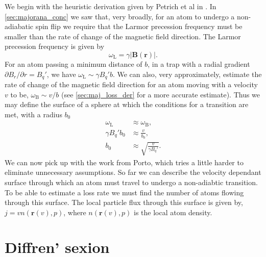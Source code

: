 We begin with the heuristic derivation given by Petrich et al in \cite{Petrich1995}.
In \autoref{sec:majorana_conc} we saw that, very broadly, for an atom to undergo a non-adiabatic spin flip we require that the Larmor precession frequency must be smaller than the rate of change of the magnetic field direction.
The Larmor precession frequency is given by
\begin{equation}
    \omega_{\textrm{L}} = \gamma \vert \mathbf{B}(\mathbf{r}) \vert.
\end{equation}
For an atom passing a minimum distance of $b$, in a trap with a radial gradient $\partial B_r / \partial r = B_q'$, we have $\omega_{\textrm{L}} \sim \gamma B_q' b$. 
We can also, very approximately, estimate the rate of change of the magnetic field direction for an atom moving with a velocity $v$ to be, $\omega_{\mathrm{B}} \sim v / b$ (see \autoref{sec:maj_loss_der} for a more accurate estimate).
Thus we may define the surface of a sphere at which the conditions for a transition are met, with a radius $b_0$
\begin{align}
    \omega_{\textrm{L}} &\approx \omega_{\textrm{B}},\\
    \gamma B_q' b_0 &\approx \frac{v}{b_0},\\
    b_0 &\approx \sqrt{\frac{v}{\gamma B_q'}}.
\end{align}
We can now pick up with the work from Porto, which tries a little harder to eliminate unnecessary assumptions.
So far we can describe the velocity dependant surface through which an atom must travel to undergo a non-adiabtic transition.
To be able to estimate a loss rate we must find the number of atoms flowing through this surface.
The local particle flux through this surface is given by, $j = v n( \mathbf{r}(v),p)$, where $n(\mathbf{r}(v),p)$ is the local atom density.

\section{Diffren' sexion} \label{sec:maj_loss_der}


